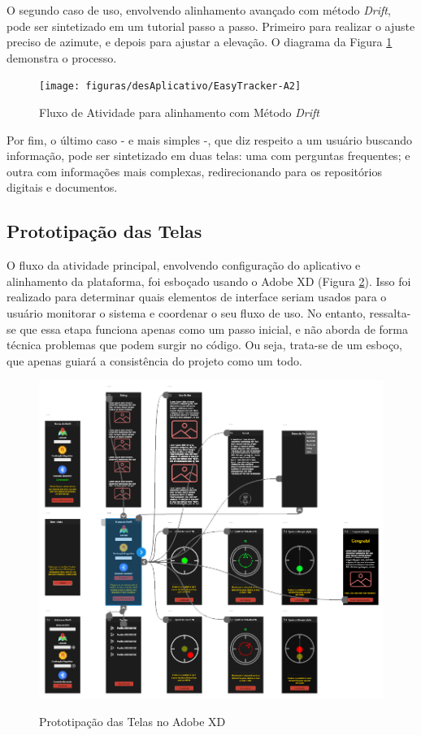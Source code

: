 O segundo caso de uso, envolvendo alinhamento avançado com método \textit{Drift}, pode ser sintetizado em um tutorial passo a passo. Primeiro para realizar o ajuste preciso de azimute, e depois para ajustar a elevação. O diagrama da Figura \ref{fig:atividadedrif} demonstra o processo.

\begin{figure}[!htb]
	\centering
	\caption{Fluxo de Atividade para alinhamento com Método \textit{Drift}}
	\texttt{[image: figuras/desAplicativo/EasyTracker-A2]}
	\label{fig:atividadedrif}
\end{figure}

Por fim, o último caso - e mais simples -, que diz respeito a um usuário buscando informação, pode ser sintetizado em duas telas: uma com perguntas frequentes; e outra com informações mais complexas, redirecionando para os repositórios digitais e documentos. 

\subsection{Prototipação das Telas}

O fluxo da atividade principal, envolvendo configuração do aplicativo e alinhamento da plataforma, foi esboçado usando o Adobe XD (Figura \ref{fig:adobexd}). Isso foi realizado para determinar quais elementos de interface seriam usados para o usuário monitorar o sistema e coordenar o seu fluxo de uso. No entanto, ressalta-se que essa etapa funciona apenas como um passo inicial, e não aborda de forma técnica problemas que podem surgir no código. Ou seja, trata-se de um esboço, que apenas guiará a consistência do projeto como um todo.

\begin{figure}[!htb]
	\centering
	\caption{Prototipação das Telas no Adobe XD}
	\includegraphics[width=0.7\linewidth]{figuras/desAplicativo/adobexd}
	\label{fig:adobexd}
\end{figure}

